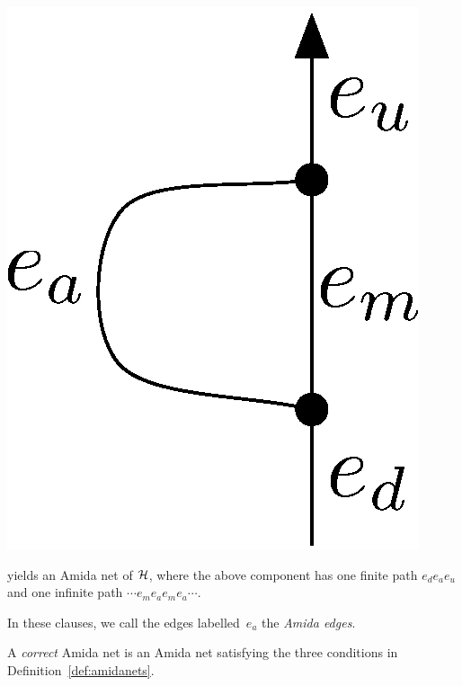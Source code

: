 \begin{definition}
\begin{itemize}
\begin{center}
	 \includegraphics[scale=0.4]{oneedge_amida.eps}
	\end{center}
       yields an Amida net of $\mathcal{H}$,
       where the above component has
       one finite path $e_de_ae_u$
       and one infinite path $\cdots e_m e_a e_m e_a \cdots$.
\end{itemize}
 \end{definition}
 In these clauses, we call the edges labelled~$e_a$ the \textit{Amida
 edges}.

 \begin{definition}
  A \textit{correct}
  Amida net is an Amida net satisfying the three conditions
  in Definition~\ref{def:amidanets}.
 \end{definition}

